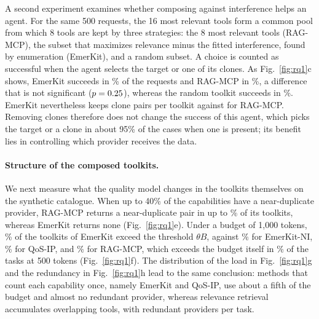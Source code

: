 \documentclass[10pt]{article}
\newcommand{\sysname}{EmerKit}
\begin{document}
A second experiment examines whether composing against interference helps an agent. For the same 500 requests, the 16 most relevant tools form a common pool from which 8 tools are kept by three strategies: the 8 most relevant tools (RAG-MCP), the subset that maximizes relevance minus the fitted interference, found by enumeration (\sysname{}), and a random subset. A choice is counted as successful when the agent selects the target or one of its clones. As Fig.~\ref{fig:rq1}c shows, \sysname{} succeeds in \RSixEmk\% of the requests and RAG-MCP in \RSixRag\%, a difference that is not significant ($p=0.25$), whereas the random toolkit succeeds in \RSixRnd\%. \sysname{} nevertheless keeps \RSixEmkClones{} clone pairs per toolkit against \RSixRagClones{} for RAG-MCP. Removing clones therefore does not change the success of this agent, which picks the target or a clone in about 95\% of the cases when one is present; its benefit lies in controlling which provider receives the data.

\paragraph{Structure of the composed toolkits.} We next measure what the quality model changes in the toolkits themselves on the synthetic catalogue. When up to 40\% of the capabilities have a near-duplicate provider, RAG-MCP returns a near-duplicate pair in up to \RARagCpMax\% of its toolkits, whereas \sysname{} returns none (Fig.~\ref{fig:rq1}e). Under a budget of 1{,}000 tokens, \RAOverEmk\% of the toolkits of \sysname{} exceed the threshold $\theta B$, against \RAOverNoInt\% for \sysname{}-NI, \RAOverZeng\% for QoS-IP, and \RAOverRag\% for RAG-MCP, which exceeds the budget itself in \RARagExceed\% of the tasks at 500 tokens (Fig.~\ref{fig:rq1}f). The distribution of the load in Fig.~\ref{fig:rq1}g and the redundancy in Fig.~\ref{fig:rq1}h lead to the same conclusion: methods that count each capability once, namely \sysname{} and QoS-IP, use about a fifth of the budget and almost no redundant provider, whereas relevance retrieval accumulates overlapping tools, with \RARagMcpRed{} redundant providers per task.
\end{document}
